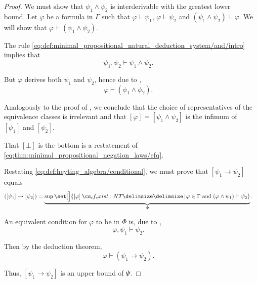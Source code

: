 \begin{proof}
  We must show that \( \psi_1 \wedge \psi_2 \) is interderivable with the greatest lower bound. Let \( \varphi \) be a formula in \( \Gamma \) such that \( \varphi \vdash \psi_1 \), \( \varphi \vdash \psi_2 \) and \( (\psi_1 \wedge \psi_2) \vdash \varphi \). We will show that \( \varphi \vdash (\psi_1 \wedge \psi_2) \).

  The rule \eqref{eq:def:minimal_propositional_natural_deduction_system/and/intro} implies that
  \begin{equation*}
    \psi_1, \psi_2 \vdash \psi_1 \wedge \psi_2.
  \end{equation*}

  But \( \varphi \) derives both \( \psi_1 \) and \( \psi_2 \), hence due to ,
  \begin{equation*}
    \varphi \vdash (\psi_1 \wedge \psi_2).
  \end{equation*}

  Analogously to the proof of , we conclude that the choice of representatives of the equivalence classes is irrelevant and that \( [\varphi] = [\psi_1 \wedge \psi_2] \) is the infimum of \( [\psi_1] \) and \( [\psi_2] \).

   That \( [\bot] \) is the bottom is a restatement of \eqref{eq:thm:minimal_propositional_negation_laws/efq}.

   Restating \eqref{eq:def:heyting_algebra/conditional}, we must prove that \( [\psi_1 \rightarrow \psi_2] \) equals
  \begin{equation*}
    ([\psi_1] \rightarrow [\psi_2]) = \underbrace{\sup\set[\Big]{ [\varphi] \given* \varphi \in \Gamma \T{and} (\varphi \wedge \psi_1) \vdash \psi_2 }}_{\Phi}.
  \end{equation*}

  An equivalent condition for \( \varphi \) to be in \( \Phi \) is, due to ,
  \begin{equation*}
    \varphi, \psi_1 \vdash \psi_2.
  \end{equation*}

  Then by the deduction theorem,
  \begin{equation*}
    \varphi \vdash (\psi_1 \rightarrow \psi_2).
  \end{equation*}

  Thus, \( [\psi_1 \rightarrow \psi_2] \) is an upper bound of \( \Psi \).


\end{proof}
